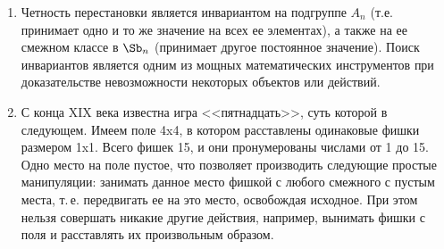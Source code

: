 \begin{enumerate}
\begin{table}[h!]
\begin{tabular}{c||c}
\footnotesize %
\begin{tabular}{cc|cc}
 $\id$    & (12)(34) & (13)(24) & (14)(23) \\[5pt]
 (12)(34) & $\id$    & (14)(23) & (13)(24) \\[3pt]\hline
 &&& \\[-5pt]
 (13)(24) & (14)(23) & $\id$    & (12)(34) \\[5pt]
 (14)(23) & (13)(24) & (12)(34) & $\id$
\end{tabular}
 &
\begin{tabular}{c|cccc}
$\sqrt[4]{1}$ & 1    & $i$  & $-1$ & $-i$ \\  \hline
1             & 1    & $i$  & $-1$ & $-i$ \\
$i$           & $i$  & $-1$ & $-i$ & 1    \\
$-1$          & $-1$ & $-i$ & 1    & $i$  \\
$-i$          & $-i$ & 1    & $i$  & $-1$
\end{tabular}
\\
\\

\hline

\end{tabular}
\caption{}\label{vier}
\end{table}

Отметим, что с точностью до изоморфизма существует всего две группы 4-го порядка: группа Клейна и циклическая группа. Несмотря на все разнообразие их представителей!




\subsection*{Игра <<Пятнадцать>>}


\item Четность перестановки является инвариантом на подгруппе $A_n$ (т.е. принимает одно и то же значение на всех ее элементах), а также на ее смежном классе в $\Sb_n$ (принимает другое постоянное значение). Поиск инвариантов является одним из мощных математических инструментов при  доказательстве невозможности некоторых объектов или действий.

\item С конца XIX века известна игра <<пятнадцать>>, суть которой в следующем. Имеем поле 4x4, в котором расставлены одинаковые фишки размером 1x1. Всего фишек 15, и они пронумерованы числами от 1 до 15. Одно место на поле пустое, что позволяет производить следующие простые манипуляции: занимать данное место фишкой с любого смежного с пустым места, т.\,е. передвигать ее на это место, освобождая исходное.
При этом нельзя совершать никакие другие действия, например, вынимать фишки с поля и расставлять их произвольным образом.


\end{enumerate}
